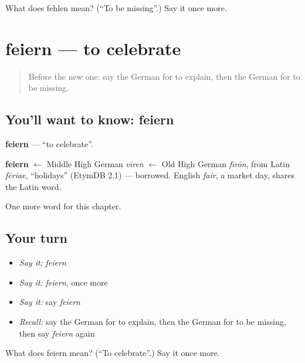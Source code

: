 \begin{tcolorbox}[breakable,colback=teal!4,colframe=teal!35!black,title={Before you move on}]
What does fehlen mean? (\textquotedblleft{}To be missing\textquotedblright{}.) Say it once more.
\end{tcolorbox}
\section[feiern]{feiern — to celebrate}

\label{lesson:GE-C146-feiern}



\begin{quote}
Before the new one: say the German for to explain, then the German for to be missing.
\end{quote}

\subsection*{You'll want to know: feiern}
\textbf{feiern} — \textquotedblleft{}to celebrate\textquotedblright{}.

\begin{cousinweb}
\textbf{feiern} $\leftarrow$ Middle High German \emph{vīren} $\leftarrow$ Old High German \emph{fīrōn}, from Latin \emph{fēriae}, \textquotedblleft{}holidays\textquotedblright{} (EtymDB 2.1) — borrowed. English \emph{fair}, a market day, shares the Latin word.
\end{cousinweb}

\begin{grammarlens}[title={What you've built}]
One more word for this chapter.
\end{grammarlens}

\subsection*{Your turn}
\begin{itemize}
\raggedright
  \item \emph{Say it:} \emph{feiern}
  \item \emph{Say it:} \emph{feiern}, once more
  \item \emph{Say it:} say \emph{feiern}
  \item \emph{Recall:} say the German for to explain, then the German for to be missing, then say \emph{feiern} again
\end{itemize}

\begin{tcolorbox}[breakable,colback=teal!4,colframe=teal!35!black,title={Before you move on}]
What does feiern mean? (\textquotedblleft{}To celebrate\textquotedblright{}.) Say it once more.
\end{tcolorbox}
